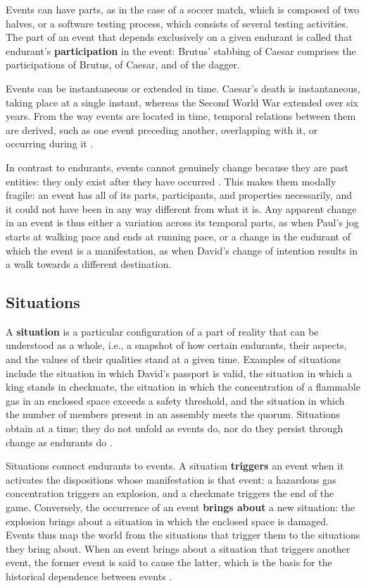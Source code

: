 Events can have parts, as in the case of a soccer match, which is composed of two halves, or a software testing process, which consists of several testing activities. The part of an event that depends exclusively on a given endurant is called that endurant's \textbf{participation} in the event: Brutus' stabbing of Caesar comprises the participations of Brutus, of Caesar, and of the dagger.

Events can be instantaneous or extended in time. Caesar's death is instantaneous, taking place at a single instant, whereas the Second World War extended over six years. From the way events are located in time, temporal relations between them are derived, such as one event preceding another, overlapping with it, or occurring during it \cite{representing_a_reference_foundational_ontology_of_events_in_sroiq_2019}.

In contrast to endurants, events cannot genuinely change because they are past entities: they only exist after they have occurred \cite{guizzardi2016ontological}. This makes them modally fragile: an event has all of its parts, participants, and properties necessarily, and it could not have been in any way different from what it is. Any apparent change in an event is thus either a variation across its temporal parts, as when Paul's jog starts at walking pace and ends at running pace, or a change in the endurant of which the event is a manifestation, as when David's change of intention results in a walk towards a different destination.

\subsection{Situations}

A \textbf{situation} is a particular configuration of a part of reality that can be understood as a whole, i.e., a snapshot of how certain endurants, their aspects, and the values of their qualities stand at a given time. Examples of situations include the situation in which David's passport is valid, the situation in which a king stands in checkmate, the situation in which the concentration of a flammable gas in an enclosed space exceeds a safety threshold, and the situation in which the number of members present in an assembly meets the quorum. Situations obtain at a time; they do not unfold as events do, nor do they persist through change as endurants do \cite{representing_a_reference_foundational_ontology_of_events_in_sroiq_2019}.

Situations connect endurants to events. A situation \textbf{triggers} an event when it activates the dispositions whose manifestation is that event: a hazardous gas concentration triggers an explosion, and a checkmate triggers the end of the game. Conversely, the occurrence of an event \textbf{brings about} a new situation: the explosion brings about a situation in which the enclosed space is damaged. Events thus map the world from the situations that trigger them to the situations they bring about. When an event brings about a situation that triggers another event, the former event is said to cause the latter, which is the basis for the historical dependence between events \cite{events_as_entities_in_ontology_driven_conceptual_modeling_2019}.

